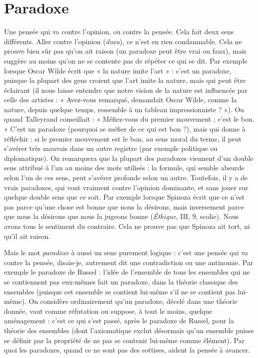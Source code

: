 \section{Paradoxe}
Une pensée qui va contre l’opinion, ou contre la pensée.
Cela fait deux sens différents. Aller contre l'opinion ({\it doxa}), ce
n’est en rien condamnable. Cela ne prouve bien sûr pas qu’on ait raison (un
paradoxe peut être vrai ou faux), mais suggère au moins qu’on ne se contente
pas de répéter ce qui se dit. Par exemple lorsque Oscar Wilde écrit que « la
nature imite l’art » : c’est un paradoxe, puisque la plupart des gens croient que
l’art imite la nature, mais qui peut être éclairant (il nous laisse entendre que
notre vision de la nature est influencée par celle des artistes : « Avez-vous
remarqué, demandait Oscar Wilde, comme la nature, depuis quelque temps,
ressemble à un tableau impressionniste ? »). Ou quand Talleyrand conseillait :
« Méfiez-vous du premier mouvement ; c’est le bon. » C’est un paradoxe (pourquoi
se méfier de ce qui est bon ?), mais qui donne à réfléchir : si le premier
mouvement est le bon, au sens moral du terme, il peut s’avérer très mauvais
dans un autre registre (par exemple politique ou diplomatique). On remarquera
que la plupart des paradoxes viennent d’un double sens attribué à l’un au
moins des mots utilisés : la formule, qui semble absurde selon l’un de ces sens,
peut s'avérer profonde selon un autre. Toutefois, il y a de vrais paradoxes, qui
vont vraiment contre l'opinion dominante, et sans jouer sur quelque double
sens que ce soit. Par exemple lorsque Spinoza écrit que ce n’est pas parce
qu’une chose est bonne que nous la désirons, mais inversement parce que nous
la désirons que nous la jugeons bonne ({\it Éthique}, III, 9, scolie). Nous avons tous
le sentiment du contraire. Cela ne prouve pas que Spinoza ait tort, ni qu’il ait
raison.

Mais le mot {\it paradoxe} à aussi un sens purement logique : c’est une pensée
qui va contre la pensée, disais-je, autrement dit une contradiction ou une antinomie.
Par exemple le paradoxe de Russel : l’idée de l’ensemble de tous les
ensembles qui ne se contiennent pas eux-mêmes fait un paradoxe, dans la
théorie classique des ensembles (puisque cet ensemble se contient lui-même s’il
ne se contient pas lui-même). On considère ordinairement qu’un paradoxe,
décelé dans une théorie donnée, vaut comme réfutation ou suppose, à tout le
moins, quelque aménagement : c’est ce qui s’est passé, après le paradoxe de
Russel, pour la théorie des ensembles (dont l’axiomatique exclut désormais
qu’un ensemble puisse se définir par la propriété de ne pas se contenir lui-même
comme élément). Par quoi les paradoxes, quand ce ne sont pas des sottises,
aident la pensée à avancer.

